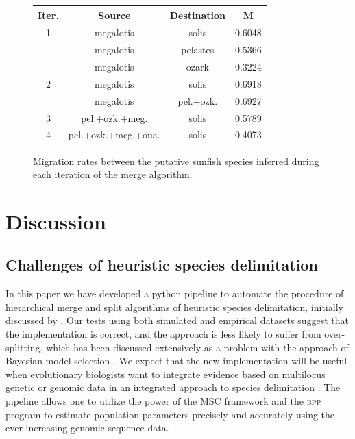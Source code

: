 \documentclass{article1}
\newcommand{\blue}[1]{{\color{blue}{#1}}}
\begin{document}
\begin{figure}[h]
	\begin{center}
		\begin{tabular}{| c | c  c  c |} 
			\hline
			\textbf{Iter.} & \textbf{Source} & \textbf{Destination} & \textbf{M} \\ 
			\hline
			1 & megalotis & solis & 0.6048 \\ 
			  & megalotis & pelastes & 0.5366 \\
			  & megalotis & ozark & 0.3224 \\
			\hline
			2 & megalotis & solis & 0.6918 \\
			  & megalotis & pel.+ozk. & 0.6927 \\
			\hline
			3 & pel.+ozk.+meg. & solis & 0.5789 \\
			\hline
			4 & pel.+ozk.+meg.+oua. & solis & 0.4073 \\
			\hline
		\end{tabular}
	\end{center}
	\caption{Migration rates between the putative sunfish species inferred during each iteration of the merge algorithm.  %
		\blue{[new table with migration rates]}
	} \label{fig:sunfish_migration}
\end{figure}

\FloatBarrier
\section{Discussion}

\subsection{Challenges of heuristic species delimitation}

In this paper we have developed a python pipeline to automate the procedure of
hierarchical merge and split algorithms of heuristic species delimitation, initially
discussed by \citet{Leache2019}.  Our tests using both simulated and empirical datasets
suggest that the implementation is correct, and the approach is less likely to suffer
from over-splitting, which has been discussed extensively as a problem with the approach
of Bayesian model selection \citep{Yang2010}.  We expect that the new implementation
will be useful when evolutionary biologists want to integrate evidence based on
multilocus genetic or genomic data in an integrated approach to species delimitation
\citep{Fujita2012}.  The pipeline allows one to utilize the power of the MSC framework
and the \textsc{bpp} program to estimate population parameters precisely and accurately
using the ever-increasing genomic sequence data.
\end{document}
